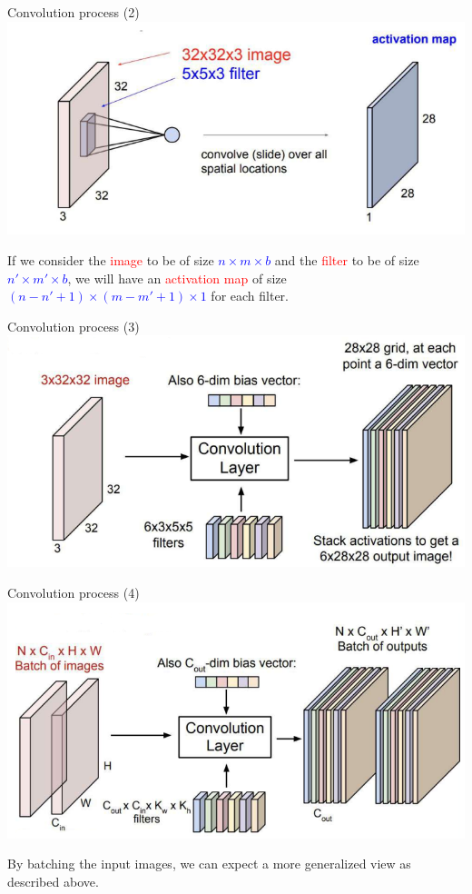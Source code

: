 \documentclass[serif, aspectratio=169]{beamer}
\begin{document}
	\begin{frame}{Convolution process (2)}
		\centering
		\includegraphics[keepaspectratio, scale=0.8]{pic/img5.png}
		\smallskip
	\begin{flushleft}
		If we consider the \textcolor{red}{image} to be of size \textcolor{blue}{\( n \times m \times b \)} and the \textcolor{red}{filter} to be of size \textcolor{blue}{\( n' \times m' \times b \)}, we will have an \textcolor{red}{activation map} of size \textcolor{blue}{\( (n - n' + 1) \times (m - m' + 1) \times 1 \)} for each filter.
	\end{flushleft}

	\end{frame}
	\begin{frame}{Convolution process (3)}
		\centering
		\includegraphics[keepaspectratio, scale=0.8]{pic/img6.png}
		\end{frame}
	\begin{frame}{Convolution process (4)}
		\centering
		\includegraphics[keepaspectratio, scale=0.7]{pic/img7.png}
		\smallskip
		\begin{flushleft}
			By batching the input images, we can expect a more generalized view as described above.
		\end{flushleft}		
	\end{frame}
\end{document}
